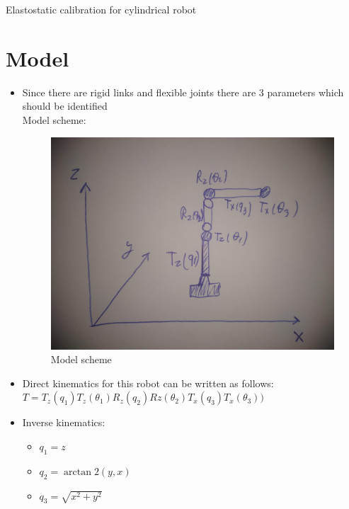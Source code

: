 \documentclass[12pt]{article}
\begin{document}
	\begin{center}
		\LARGE{Elastostatic calibration for cylindrical robot}
	\end{center}
	\section{Model}
	\begin{itemize}
		\item Since there are rigid links and flexible joints there are 3 parameters which should be identified \\
		Model scheme:
		\begin{figure}[H]
			\centering
			\includegraphics[scale=0.07]{scheme.jpg}
			\caption{Model scheme}
		\end{figure}
	
		\item Direct kinematics for this robot can be written as follows: \\
		\begin{math}
		T = T_{z}(q_1)T_{z}(\theta _{1})R_{z}(q_2)Rz(\theta _2)T_x(q_3)T_x(\theta _3))
		\end{math}
		
		\item Inverse kinematics:
		\begin{itemize}
			\item $q_1 = z$
			\item $q_2 = \arctan2(y, x)$
			\item $q_3 = \sqrt{x^2 + y ^2} $
		\end{itemize}
	
	\end{itemize}
\end{document}
